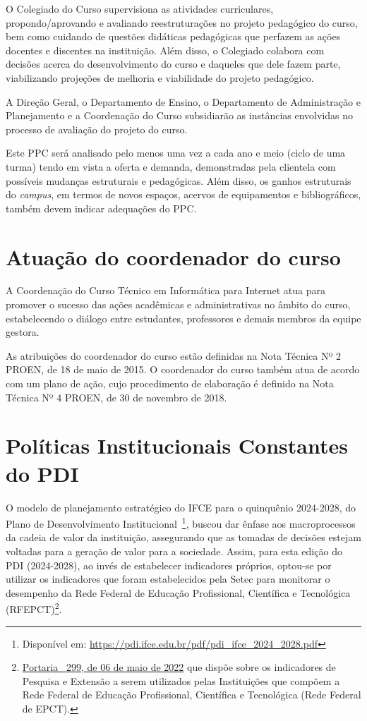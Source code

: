 \documentclass[
	12pt,				%
	openright,			%
	twoside,			%
	a4paper,			%
	chapter=TITLE,		%
	english,			%
	french,				%
	spanish,			%
	brazil,				%
	]{abntex2}
\begin{document}
O Colegiado do Curso supervisiona as atividades curriculares, propondo/aprovando e avaliando reestruturações no projeto pedagógico do curso, bem como cuidando de questões didáticas pedagógicas que perfazem as ações docentes e discentes na instituição. Além disso, o Colegiado colabora com decisões acerca do desenvolvimento do curso e daqueles que dele fazem parte, viabilizando projeções de melhoria e viabilidade do projeto pedagógico.

A Direção Geral, o Departamento de Ensino, o Departamento de Administração e Planejamento e a Coordenação do Curso subsidiarão as instâncias envolvidas no processo de avaliação do projeto do curso.

Este PPC será analisado pelo menos uma vez a cada ano e meio (ciclo de uma turma) tendo em vista a oferta e demanda, 
demonstradas pela clientela com possíveis mudanças estruturais e pedagógicas. Além disso, os ganhos estruturais do \textit{campus}, em termos de novos espaços, acervos de equipamentos e bibliográficos, também devem indicar adequações do PPC.

\chapter{Atuação do coordenador do curso}

A Coordenação do Curso Técnico em Informática para Internet atua para promover o sucesso das ações acadêmicas e administrativas no
âmbito do curso, estabelecendo o diálogo entre estudantes, professores e demais
membros da equipe gestora.

As atribuições do coordenador do curso estão definidas na Nota Técnica Nº 2
PROEN, de 18 de maio de 2015. O coordenador do curso também atua de acordo
com um plano de ação, cujo procedimento de elaboração é definido na Nota Técnica
Nº 4 PROEN, de 30 de novembro de 2018.


\chapter{Políticas Institucionais Constantes do PDI}%


O modelo de planejamento estratégico do IFCE para o quinquênio
2024-2028, do Plano de Desenvolvimento Institucional~\footnote{Disponível em:
\url{https://pdi.ifce.edu.br/pdf/pdi_ifce_2024_2028.pdf}}, buscou dar ênfase aos macroprocessos da cadeia de valor da instituição,
assegurando que as tomadas de decisões estejam voltadas para a geração de valor
para a sociedade. Assim, para esta edição do PDI (2024-2028), ao invés de estabelecer indicadores próprios, optou-se
por utilizar os indicadores que foram estabelecidos pela Setec para monitorar o
desempenho da Rede Federal de Educação Profissional, Científica e Tecnológica
(RFEPCT)\footnote{\href{https://www.in.gov.br/en/web/dou/-/portaria-n-299-de-6-de-maio-de-2022-399680297}{Portaria \N~299, de 06 de maio de 2022}
que dispõe sobre os indicadores de Pesquisa e Extensão a serem utilizados pelas
Instituições que compõem a Rede Federal de Educação Profissional, Científica e
Tecnológica (Rede Federal de EPCT).}.
\end{document}
